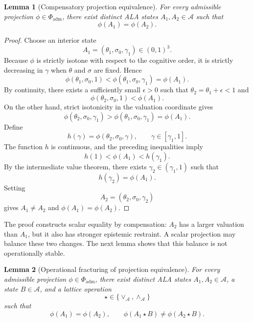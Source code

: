 \documentclass[reqno,final]{amsart}
\theoremstyle{definition}
\theoremstyle{plain}
\newtheorem{lemma}{Lemma}
\theoremstyle{remark}
\providecommand{\cA}{\mathcal{A}}
\providecommand{\cPhi}{\Phi}
\begin{document}
\begin{lemma}[Compensatory projection equivalence]
\label{lem:projection-equivalence-existence}
For every admissible projection \(\phi\in\cPhi_{\mathrm{adm}}\), there exist distinct ALA states \(A_1,A_2\in\cA\) such that
\begin{equation}
\phi(A_1)=\phi(A_2).
\label{eq:existence-same-projection}
\end{equation}
\end{lemma}

\begin{proof}
Choose an interior state
\[
A_1=(\theta_1,\sigma_0,\gamma_1)\in(0,1)^3.
\]
Because \(\phi\) is strictly isotone with respect to the cognitive order, it is strictly decreasing in \(\gamma\) when \(\theta\) and \(\sigma\) are fixed. Hence
\[
\phi(\theta_1,\sigma_0,1)<\phi(\theta_1,\sigma_0,\gamma_1)=\phi(A_1).
\]
By continuity, there exists a sufficiently small \(\epsilon>0\) such that \(\theta_2=\theta_1+\epsilon<1\) and
\[
\phi(\theta_2,\sigma_0,1)<\phi(A_1).
\]
On the other hand, strict isotonicity in the valuation coordinate gives
\[
\phi(\theta_2,\sigma_0,\gamma_1)>
\phi(\theta_1,\sigma_0,\gamma_1)=\phi(A_1).
\]
Define
\[
h(\gamma)=\phi(\theta_2,\sigma_0,\gamma),
\qquad \gamma\in[\gamma_1,1].
\]
The function \(h\) is continuous, and the preceding inequalities imply
\[
h(1)<\phi(A_1)<h(\gamma_1).
\]
By the intermediate value theorem, there exists \(\gamma_2\in(\gamma_1,1)\) such that
\[
h(\gamma_2)=\phi(A_1).
\]
Setting
\[
A_2=(\theta_2,\sigma_0,\gamma_2)
\]
gives \(A_1\neq A_2\) and \(\phi(A_1)=\phi(A_2)\).
\end{proof}

The proof constructs scalar equality by compensation: \(A_2\) has a larger valuation than \(A_1\), but it also has stronger epistemic restraint. A scalar projection may balance these two changes. The next lemma shows that this balance is not operationally stable.

\begin{lemma}[Operational fracturing of projection equivalence]
\label{lem:operational-fracturing}
For every admissible projection \(\phi\in\cPhi_{\mathrm{adm}}\), there exist distinct ALA states \(A_1,A_2\in\cA\), a state \(B\in\cA\), and a lattice operation
\[
\star\in\{\vee_{\cA},\wedge_{\cA}\}
\]
such that
\begin{equation}
\phi(A_1)=\phi(A_2),
\qquad
\phi(A_1\star B)\neq \phi(A_2\star B).
\label{eq:fracturing-statement}
\end{equation}
\end{lemma}
\end{document}
